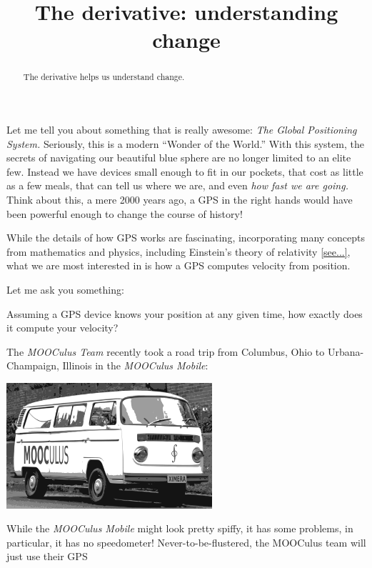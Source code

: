 \documentclass{ximera}
\title{The derivative: understanding change}
\begin{document}
\begin{abstract}
The derivative helps us understand change.
\end{abstract}
\maketitle



Let me tell you about something that is really awesome: \textit{The
  Global Positioning System.} Seriously, this is a modern ``Wonder of
the World.'' With this system, the secrets of navigating our beautiful
blue sphere are no longer limited to an elite few. Instead we have
devices small enough to fit in our pockets, that cost as little as a
few meals, that can tell us where we are, and even \textit{how fast we
  are going.} Think about this, a mere 2000 years ago, a GPS in the
right hands would have been powerful enough to change the course of
history!

While the details of how GPS works are fascinating, incorporating many
concepts from mathematics and physics, including Einstein's theory of
relativity \ref{see...}, what we are most interested in is how a GPS
computes velocity from position.

Let me ask you something:

\begin{question}
Assuming a GPS device knows your position at any given time, how
exactly does it compute your velocity?
\begin{freeResponse}
\end{freeResponse}
\end{question}



The \textit{MOOCulus Team} recently took a road trip from Columbus,
Ohio to Urbana-Champaign, Illinois in the \textit{MOOCulus Mobile}:
\begin{image}
\includegraphics[width=3in]{mooculusMobile.pdf}
\end{image}
While the \textit{MOOCulus Mobile} might look pretty spiffy, it has
some problems, in particular, it has no speedometer!
Never-to-be-flustered, the MOOCulus team will just use their GPS
\end{document}
